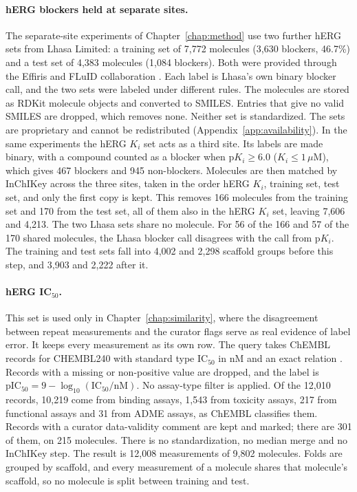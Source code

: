 \paragraph{hERG blockers held at separate sites.} The separate-site experiments of Chapter~\ref{chap:method} use two further hERG sets from Lhasa Limited: a training set of 7,772 molecules (3,630 blockers, 46.7\%) and a test set of 4,383 molecules (1,084 blockers). Both were provided through the Effiris and FLuID collaboration \citep{Bassani2023, Hanser2023}. Each label is Lhasa's own binary blocker call, and the two sets were labeled under different rules. The molecules are stored as RDKit molecule objects and converted to SMILES. Entries that give no valid SMILES are dropped, which removes none. Neither set is standardized. The sets are proprietary and cannot be redistributed (Appendix~\ref{app:availability}). In the same experiments the hERG $K_i$ set acts as a third site. Its labels are made binary, with a compound counted as a blocker when $\mathrm{p}K_i \ge 6.0$ ($K_i \le 1\,\mu$M), which gives 467 blockers and 945 non-blockers. Molecules are then matched by InChIKey across the three sites, taken in the order hERG $K_i$, training set, test set, and only the first copy is kept. This removes 166 molecules from the training set and 170 from the test set, all of them also in the hERG $K_i$ set, leaving 7,606 and 4,213. The two Lhasa sets share no molecule. For 56 of the 166 and 57 of the 170 shared molecules, the Lhasa blocker call disagrees with the call from p$K_i$. The training and test sets fall into 4,002 and 2,298 scaffold groups before this step, and 3,903 and 2,222 after it.

\paragraph{\texorpdfstring{hERG IC$_{50}$.}{hERG IC50.}} This set is used only in Chapter~\ref{chap:similarity}, where the disagreement between repeat measurements and the curator flags serve as real evidence of label error. It keeps every measurement as its own row. The query takes ChEMBL records for CHEMBL240 with standard type IC$_{50}$ in nM and an exact relation \citep{Zdrazil2023}. Records with a missing or non-positive value are dropped, and the label is $\mathrm{pIC_{50}} = 9 - \log_{10}(\mathrm{IC_{50}}/\mathrm{nM})$. No assay-type filter is applied. Of the 12,010 records, 10,219 come from binding assays, 1,543 from toxicity assays, 217 from functional assays and 31 from ADME assays, as ChEMBL classifies them. Records with a curator data-validity comment are kept and marked; there are 301 of them, on 215 molecules. There is no standardization, no median merge and no InChIKey step. The result is 12,008 measurements of 9,802 molecules. Folds are grouped by scaffold, and every measurement of a molecule shares that molecule's scaffold, so no molecule is split between training and test.

